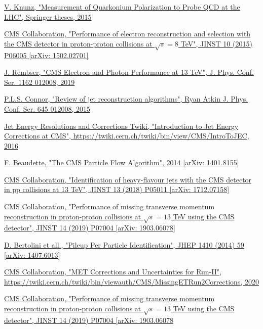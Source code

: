 \documentclass[a4paper, 10pt, openright]{report}
\begin{document}
\begin{thebibliography}{1}
\href{http://inspirehep.net/record/1381380}{V. Knunz,
"Measurement of Quarkonium Polarization to Probe QCD at the LHC",
Springer theses, 2015}

\href{https://arxiv.org/abs/1502.02701}{CMS Collaboration,
"Performance of electron reconstruction and selection with the CMS detector in proton-proton collisions at $\sqrt{s} = 8$ TeV",
JINST 10 (2015) P06005 [arXiv: 1502.02701]}

\href{https://iopscience.iop.org/article/10.1088/1742-6596/1162/1/012008/pdf}{J. Rembser,
"CMS Electron and Photon Performance at 13 TeV",
J. Phys. Conf. Ser. 1162 012008, 2019}

\href{https://iopscience.iop.org/article/10.1088/1742-6596/645/1/012008/pdf}{P.L.S. Connor,
"Review of jet reconstruction algorithms",
Ryan Atkin J. Phys. Conf. Ser. 645 012008, 2015}

\href{https://twiki.cern.ch/twiki/bin/view/CMS/IntroToJEC}{Jet Energy Resolutions and Corrections Twiki, "Introduction to Jet Energy Corrections at CMS", \url{https://twiki.cern.ch/twiki/bin/view/CMS/IntroToJEC},
2016}

\href{https://arxiv.org/abs/1401.8155}{F. Beaudette,
"The CMS Particle Flow Algorithm",
2014 [arXiv: 1401.8155]}

\href{https://arxiv.org/abs/1712.07158}{CMS Collaboration,
"Identification of heavy-flavour jets with the CMS detector in pp collisions at 13 TeV",
JINST 13 (2018) P05011 [arXiv: 1712.07158]}

\href{https://arxiv.org/abs/1903.06078}{CMS Collaboration,
"Performance of missing transverse momentum reconstruction in proton-proton collisions at $\sqrt{s} = 13$ TeV using the CMS detector",
JINST 14 (2019) P07004 [arXiv: 1903.06078]}

\href{https://arxiv.org/abs/1407.6013}{D. Bertolini et all.,
"Pileup Per Particle Identification", 
JHEP 1410 (2014) 59 [arXiv: 1407.6013]}

\href{https://twiki.cern.ch/twiki/bin/viewauth/CMS/MissingETRun2Corrections}{CMS Collaboration,
"MET Corrections and Uncertainties for Run-II", \url{https://twiki.cern.ch/twiki/bin/viewauth/CMS/MissingETRun2Corrections}, 2020}

\href{https://arxiv.org/abs/1903.06078}{CMS Collaboration,
"Performance of missing transverse momentum reconstruction in proton-proton collisions at $\sqrt{s} = 13$ TeV using the CMS detector",
JINST 14 (2019) P07004 [arXiv: 1903.06078}


\end{thebibliography}
\end{document}
